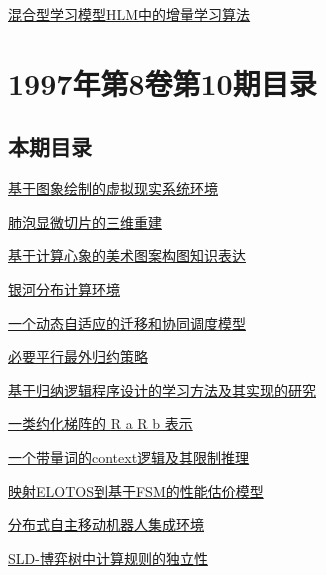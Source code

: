 \documentclass[a4paper]{article}
\begin{document}
\href{http://www.jos.org.cn/ch/reader/download_pdf.aspx?file_no=19971111&year_id=1997&quarter_id=11&falg=1}{混合型学习模型HLM中的增量学习算法}


\section{\textbf{1997年第8卷第10期目录}}
\subsection{本期目录}
\href{http://www.jos.org.cn/ch/reader/download_pdf.aspx?file_no=19971001&year_id=1997&quarter_id=10&falg=1}{基于图象绘制的虚拟现实系统环境}

\href{http://www.jos.org.cn/ch/reader/download_pdf.aspx?file_no=19971002&year_id=1997&quarter_id=10&falg=1}{肺泡显微切片的三维重建}

\href{http://www.jos.org.cn/ch/reader/download_pdf.aspx?file_no=19971003&year_id=1997&quarter_id=10&falg=1}{基于计算心象的美术图案构图知识表达}

\href{http://www.jos.org.cn/ch/reader/download_pdf.aspx?file_no=19971004&year_id=1997&quarter_id=10&falg=1}{银河分布计算环境}

\href{http://www.jos.org.cn/ch/reader/download_pdf.aspx?file_no=19971005&year_id=1997&quarter_id=10&falg=1}{一个动态自适应的迁移和协同调度模型}

\href{http://www.jos.org.cn/ch/reader/download_pdf.aspx?file_no=19971006&year_id=1997&quarter_id=10&falg=1}{必要平行最外归约策略}

\href{http://www.jos.org.cn/ch/reader/download_pdf.aspx?file_no=19971007&year_id=1997&quarter_id=10&falg=1}{基于归纳逻辑程序设计的学习方法及其实现的研究}

\href{http://www.jos.org.cn/ch/reader/download_pdf.aspx?file_no=19971008&year_id=1997&quarter_id=10&falg=1}{一类约化梯阵的 R a R b 表示}

\href{http://www.jos.org.cn/ch/reader/download_pdf.aspx?file_no=19971009&year_id=1997&quarter_id=10&falg=1}{一个带量词的context逻辑及其限制推理}

\href{http://www.jos.org.cn/ch/reader/download_pdf.aspx?file_no=19971010&year_id=1997&quarter_id=10&falg=1}{映射ELOTOS到基于FSM的性能估价模型}

\href{http://www.jos.org.cn/ch/reader/download_pdf.aspx?file_no=19971011&year_id=1997&quarter_id=10&falg=1}{分布式自主移动机器人集成环境}

\href{http://www.jos.org.cn/ch/reader/download_pdf.aspx?file_no=19971012&year_id=1997&quarter_id=10&falg=1}{SLD-博弈树中计算规则的独立性}
\end{document}
